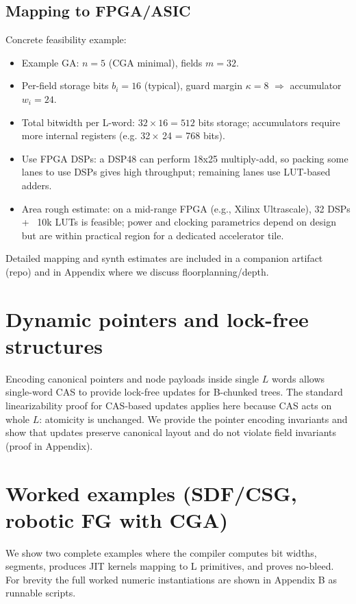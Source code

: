 \documentclass[11pt]{article}
\theoremstyle{definition}
\theoremstyle{plain}
\begin{document}
\subsection{Mapping to FPGA/ASIC}
Concrete feasibility example:
\begin{itemize}
  \item Example GA: \(n=5\) (CGA minimal), fields \(m=32\).
  \item Per-field storage bits \(b_i=16\) (typical), guard margin \(\kappa=8\) $\Rightarrow$ accumulator \(w_i=24\).
  \item Total bitwidth per L-word: \(32\times 16 = 512\) bits storage; accumulators require more internal registers (e.g. 32\,\(\times\) 24 = 768 bits).
  \item Use FPGA DSPs: a DSP48 can perform 18x25 multiply-add, so packing some lanes to use DSPs gives high throughput; remaining lanes use LUT-based adders.
  \item Area rough estimate: on a mid-range FPGA (e.g., Xilinx Ultrascale), 32 DSPs + ~10k LUTs is feasible; power and clocking parametrics depend on design but are within practical region for a dedicated accelerator tile.
\end{itemize}

\noindent Detailed mapping and synth estimates are included in a companion artifact (repo) and in Appendix where we discuss floorplanning/depth.

\section{Dynamic pointers and lock-free structures}
Encoding canonical pointers and node payloads inside single \(L\) words allows single-word CAS to provide lock-free updates for B-chunked trees. The standard linearizability proof for CAS-based updates applies here because CAS acts on whole \(L\): atomicity is unchanged. We provide the pointer encoding invariants and show that updates preserve canonical layout and do not violate field invariants (proof in Appendix).

\section{Worked examples (SDF/CSG, robotic FG with CGA)}
We show two complete examples where the compiler computes bit widths, segments, produces JIT kernels mapping to L primitives, and proves no-bleed. For brevity the full worked numeric instantiations are shown in Appendix B as runnable scripts.
\end{document}
